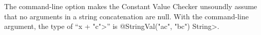 The  command-line option makes the
Constant Value Checker unsoundly assume that no arguments in a string
concatenation are null.
With the command-line argument, the type of ``\<x + "c">'' is
\<@StringVal("ac", "bc") String>.


